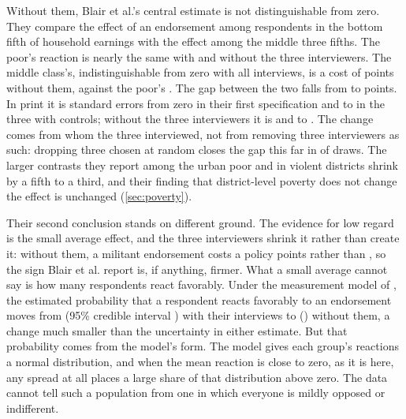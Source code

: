\documentclass[11pt,letterpaper]{article}
\begin{document}
Without them, Blair et al.'s central estimate is not distinguishable from zero. They compare the effect of an endorsement among respondents in the bottom fifth of household earnings with the effect among the middle three fifths. The poor's reaction is nearly the same with and without the three interviewers. The middle class's, indistinguishable from zero with all interviews, is a cost of \BlairMiddleWithoutPoints{} points without them, against the poor's \BlairLowWithoutPoints{}. The gap between the two falls from \BlairGapFullPoints{} to \BlairGapWithoutPoints{} points. In print it is \BlairGapTFirstFull{} standard errors from zero in their first specification and \BlairGapTControlsFullMin{} to \BlairGapTControlsFullMax{} in the three with controls; without the three interviewers it is \BlairGapTFirstWithout{} and \BlairGapTControlsWithoutMin{} to \BlairGapTControlsWithoutMax{}. The change comes from whom the three interviewed, not from removing three interviewers as such: dropping three chosen at random closes the gap this far in \BlairPlaceboGapCount{} of \BlairPlaceboDraws{} draws. The larger contrasts they report among the urban poor and in violent districts shrink by a fifth to a third, and their finding that district-level poverty does not change the effect is unchanged (\cref{sec:poverty}).

Their second conclusion stands on different ground. The evidence for low regard is the small average effect, and the three interviewers shrink it rather than create it: without them, a militant endorsement costs a policy \PooledATEPoints{} points rather than \FullATEPoints{}, so the sign Blair et al. report is, if anything, firmer. What a small average cannot say is how many respondents react favorably. Under the measurement model of \citet{bullock2011statistical}, the estimated probability that a respondent reacts favorably to an endorsement moves from \FullPrimaryShare{} (95\% credible interval \FullPrimaryInterval{}) with their interviews to \PrimaryShare{} (\PrimaryInterval{}) without them, a change much smaller than the uncertainty in either estimate. But that probability comes from the model's form. The model gives each group's reactions a normal distribution, and when the mean reaction is close to zero, as it is here, any spread at all places a large share of that distribution above zero. The data cannot tell such a population from one in which everyone is mildly opposed or indifferent.
\end{document}

